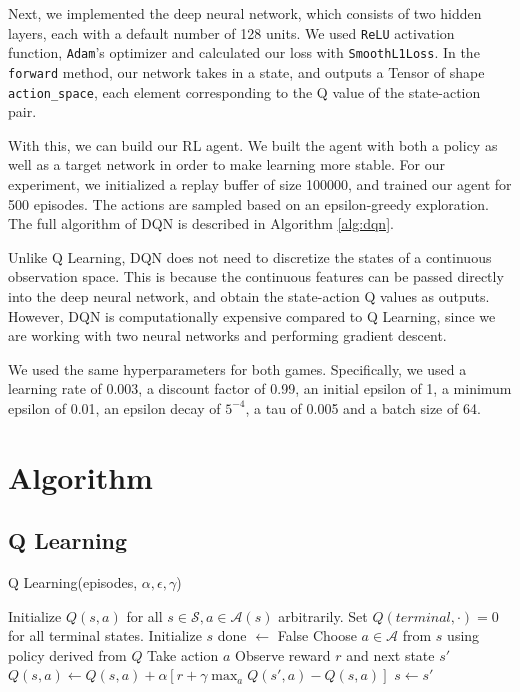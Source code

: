 \documentclass{article}
\begin{document}
Next, we implemented the deep neural network, which consists of two hidden
layers, each with a default number of 128 units. We used \verb+ReLU+ activation
function, \verb+Adam+'s optimizer and calculated our loss with
\verb+SmoothL1Loss+. In the \verb+forward+ method, our network takes in a
state, and outputs a Tensor of shape \verb+action_space+, each element
corresponding to the Q value of the state-action pair.

With this, we can build our RL agent. We built the agent with both a policy as
well as a target network in order to make learning more stable. For our
experiment, we initialized a replay buffer of size 100000, and trained our
agent for 500 episodes. The actions are sampled based on an epsilon-greedy
exploration. The full algorithm of DQN is described in Algorithm \ref{alg:dqn}.

Unlike Q Learning, DQN does not need to discretize the states of a continuous
observation space. This is because the continuous features can be passed
directly into the deep neural network, and obtain the state-action Q values as
outputs. However, DQN is computationally expensive compared to Q Learning,
since we are working with two neural networks and performing gradient descent.

We used the same hyperparameters for both games. Specifically, we used a
learning rate of 0.003, a discount factor of 0.99, an initial epsilon of 1, a
minimum epsilon of 0.01, an epsilon decay of \(5^{-4}\), a tau of 0.005 and a
batch size of 64.

\section{Algorithm}

\subsection{Q Learning}

\begin{algorithm}
      \caption{Q Learning(episodes, \(\alpha, \epsilon, \gamma\))}
      \label{alg:qlearning}
      \begin{algorithmic}[1]
            \State Initialize \(Q(s,a)\) for all \(s \in \mathcal{S}, a \in \mathcal{A}(s)\) arbitrarily.
            \State Set \(Q(terminal, \cdot) = 0 \) for all terminal states.
            \State Initialize \(s\)
            \State done \(\leftarrow\) False
            \State Choose \(a \in \mathcal{A}\) from \(s\) using policy derived from \(Q\) 
            \State Take action \(a\)
            \State Observe reward \(r\) and next state \(s'\)
            \State \(Q(s, a) \leftarrow Q(s, a) + \alpha \left[r + \gamma \max_{a} Q(s', a) - Q(s, a)\right]\) 
            \State \(s \leftarrow s'\)
            \EndWhile
            \EndFor
      \end{algorithmic}
\end{algorithm}
\end{document}

